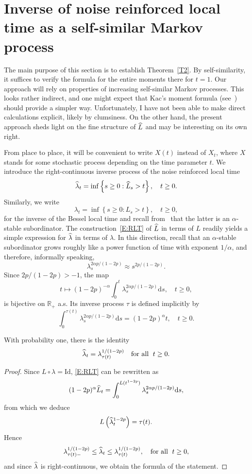 \documentclass[AHL,Unicode,longabstracts,published]{cedram}
\renewcommand{\hat}[1]{\widehat{#1}}
\newcommand{\dd}{\mathrm{d}}
\newcommand{\rmId}{\mathrm{Id}}
\newcommand{\R}{\mathbb{R}}
\let\oldhat\hat
\renewcommand*{\hat}[1]{\mathchoice{\widehat{#1}}{\widehat{#1}}{\oldhat{#1}}{\oldhat{#1}}}
\begin{document}
\section{Inverse of noise reinforced local time as a self-similar Markov process}\label{sec:inverseRLT}
The main purpose of this section is to establish Theorem~\ref{T2}. By self-similarity, it suffices to verify the formula for the entire moments there for $t=1$. Our approach will rely on properties of increasing self-similar Markov processes. This looks rather indirect, and one might expect that Kac's moment formula (see~\cite{FP}) should provide a simpler way. Unfortunately, I have not been able to make direct calculations explicit, likely by clumsiness. On the other hand, the present approach sheds light on the fine structure of $\hat{L}$ and may be interesting on its own right.

From place to place, it will be convenient to write $X(t)$ instead of $X_t$, where $X$ stands for some stochastic process depending on the time parameter $t$. We introduce the right-continuous inverse process of the noise reinforced local time
\[
\hat \lambda_t=\inf\left\{s\geq 0: \hat{L}_s>t\right\}, \quad t\geq 0.
\]
Similarly, we write
\[
\lambda_t=\inf\left\{s\geq 0: {L}_s>t\right\}, \quad t\geq 0,
\]
for the inverse of the Bessel local time and recall from~\cite[Proposition~3.2]{DRVY} that the latter is an $\alpha$-stable subordinator. The construction~\eqref{E:RLT} of $\hat{L}$ in terms of ${L}$ readily yields a simple expression for $\hat \lambda$ in terms of $\lambda$. In this direction, recall that an $\alpha$-stable subordinator grows roughly like a power function of time with exponent $1/\alpha$, and therefore, informally speaking,
\[
\lambda_s^{2\alpha p/(1-2p)}\approx s^{2p/(1-2p)}.
\]
Since $2p/(1-2p)>-1$, the map
\[
t\mapsto (1-2p)^{-\alpha} \int_0^{t} \lambda_s^{2\alpha p/(1-2p)} \dd s, \quad t\geq 0,
\]
is bijective on $\R_+$ a.s. Its inverse process $\tau$ is defined implicitly by
\begin{equation}\label{E:rho}
\int_0^{\tau(t)} \lambda_s^{2\alpha p/(1-2p)} \dd s = (1-2p)^{\alpha} t, \quad t\geq 0.
\end{equation}

\begin{lemm}\label{L5}
With probability one, there is the identity
\[
\hat \lambda_t= \lambda_{\tau(t)}^{1/(1-2p)}\quad \text{for all }\; t\geq 0.
\]
\end{lemm}

\begin{proof}
Since $L\circ \lambda = \rmId$, \eqref{E:RLT} can be rewritten as
\[
(1-2p)^{\alpha} \hat{L}_t= \int_0^{L(t^{1-2p})} \lambda_s^{2\alpha p/(1-2p)} \dd s,
\]
from which we deduce
\[
L\left(\hat \lambda_t^{1-2p}\right)=\tau(t).
\]
Hence
\[
\lambda_{\tau(t)-}^{1/(1-2p)}\leq \hat \lambda_t \leq \lambda_{\tau(t)}^{1/(1-2p)}, \quad \text{for all }\; t\geq 0,
\]
and since $\hat \lambda$ is right-continuous, we obtain the formula of the statement.
\end{proof}
\end{document}
